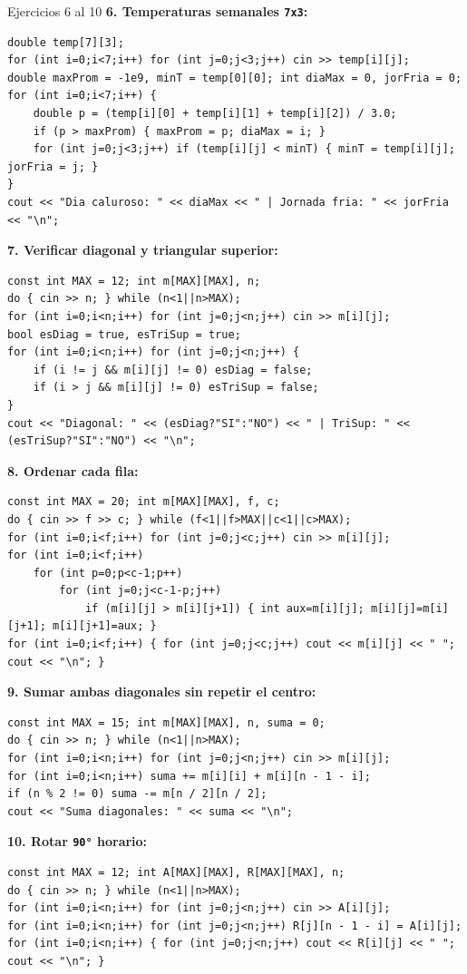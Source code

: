 \documentclass[11pt,letterpaper]{article}
\begin{document}
\begin{solucion}{Ejercicios 6 al 10}
\textbf{6. Temperaturas semanales \texttt{7x3}:}
\begin{lstlisting}[style=cppmonitoria]
double temp[7][3];
for (int i=0;i<7;i++) for (int j=0;j<3;j++) cin >> temp[i][j];
double maxProm = -1e9, minT = temp[0][0]; int diaMax = 0, jorFria = 0;
for (int i=0;i<7;i++) {
    double p = (temp[i][0] + temp[i][1] + temp[i][2]) / 3.0;
    if (p > maxProm) { maxProm = p; diaMax = i; }
    for (int j=0;j<3;j++) if (temp[i][j] < minT) { minT = temp[i][j]; jorFria = j; }
}
cout << "Dia caluroso: " << diaMax << " | Jornada fria: " << jorFria << "\n";
\end{lstlisting}

\textbf{7. Verificar diagonal y triangular superior:}
\begin{lstlisting}[style=cppmonitoria]
const int MAX = 12; int m[MAX][MAX], n;
do { cin >> n; } while (n<1||n>MAX);
for (int i=0;i<n;i++) for (int j=0;j<n;j++) cin >> m[i][j];
bool esDiag = true, esTriSup = true;
for (int i=0;i<n;i++) for (int j=0;j<n;j++) {
    if (i != j && m[i][j] != 0) esDiag = false;
    if (i > j && m[i][j] != 0) esTriSup = false;
}
cout << "Diagonal: " << (esDiag?"SI":"NO") << " | TriSup: " << (esTriSup?"SI":"NO") << "\n";
\end{lstlisting}

\textbf{8. Ordenar cada fila:}
\begin{lstlisting}[style=cppmonitoria]
const int MAX = 20; int m[MAX][MAX], f, c;
do { cin >> f >> c; } while (f<1||f>MAX||c<1||c>MAX);
for (int i=0;i<f;i++) for (int j=0;j<c;j++) cin >> m[i][j];
for (int i=0;i<f;i++)
    for (int p=0;p<c-1;p++)
        for (int j=0;j<c-1-p;j++)
            if (m[i][j] > m[i][j+1]) { int aux=m[i][j]; m[i][j]=m[i][j+1]; m[i][j+1]=aux; }
for (int i=0;i<f;i++) { for (int j=0;j<c;j++) cout << m[i][j] << " "; cout << "\n"; }
\end{lstlisting}

\textbf{9. Sumar ambas diagonales sin repetir el centro:}
\begin{lstlisting}[style=cppmonitoria]
const int MAX = 15; int m[MAX][MAX], n, suma = 0;
do { cin >> n; } while (n<1||n>MAX);
for (int i=0;i<n;i++) for (int j=0;j<n;j++) cin >> m[i][j];
for (int i=0;i<n;i++) suma += m[i][i] + m[i][n - 1 - i];
if (n % 2 != 0) suma -= m[n / 2][n / 2];
cout << "Suma diagonales: " << suma << "\n";
\end{lstlisting}

\textbf{10. Rotar \texttt{90°} horario:}
\begin{lstlisting}[style=cppmonitoria]
const int MAX = 12; int A[MAX][MAX], R[MAX][MAX], n;
do { cin >> n; } while (n<1||n>MAX);
for (int i=0;i<n;i++) for (int j=0;j<n;j++) cin >> A[i][j];
for (int i=0;i<n;i++) for (int j=0;j<n;j++) R[j][n - 1 - i] = A[i][j];
for (int i=0;i<n;i++) { for (int j=0;j<n;j++) cout << R[i][j] << " "; cout << "\n"; }
\end{lstlisting}
\end{solucion}
\end{document}
